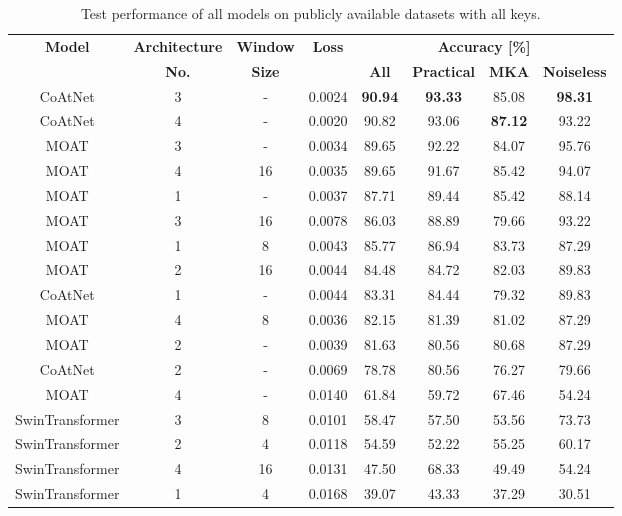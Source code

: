 \documentclass[a4paper,11pt,twoside]{report}
\theoremstyle{definition}
\begin{document}
\begin{table}[h!]
\centering
\caption{Test performance of all models on publicly available datasets with all keys.}
\begin{adjustbox}{max width=\textwidth}
\begin{tabular}{c|c|c|c|cccc}
\hline
\textbf{Model} & \textbf{Architecture} & \textbf{Window} & \textbf{Loss} & \multicolumn{4}{c}{\textbf{Accuracy [\%]}} \\
\cline{5-8}
       &   \textbf{No.}  & \textbf{Size}&        & \textbf{All} & \textbf{Practical} & \textbf{MKA} & \textbf{Noiseless}  \\
\hline
CoAtNet & 3 & - & 0.0024 & \textbf{90.94} & \textbf{93.33} & 85.08 & \textbf{98.31}  \\
CoAtNet & 4 & - & 0.0020 & 90.82 & 93.06 & \textbf{87.12} & 93.22  \\
MOAT & 3 & - & 0.0034 & 89.65 & 92.22 & 84.07 & 95.76  \\
MOAT & 4 & 16 & 0.0035 & 89.65 & 91.67 & 85.42 &	94.07 \\
MOAT & 1 & - & 0.0037 & 87.71 & 89.44 & 85.42 & 88.14  \\
MOAT & 3 & 16 & 0.0078 & 86.03 & 88.89 & 79.66 & 93.22  \\
MOAT & 1 & 8 & 0.0043 & 85.77 & 86.94 & 83.73 & 87.29  \\
MOAT & 2 & 16 & 0.0044 & 84.48 & 84.72 & 82.03 & 89.83  \\
CoAtNet & 1 & - & 0.0044 & 83.31 & 84.44 & 79.32 & 89.83  \\
MOAT & 4 & 8 & 0.0036 & 82.15 & 81.39 & 81.02 & 87.29 \\
MOAT & 2 & - & 0.0039 & 81.63 & 80.56 & 80.68 & 87.29 \\
CoAtNet & 2 & - & 0.0069 & 78.78 & 80.56 & 76.27 & 79.66  \\
MOAT & 4 & - & 0.0140 & 61.84 & 59.72 & 67.46 & 54.24  \\
SwinTransformer & 3 & 8 & 0.0101 & 58.47 & 57.50 & 53.56 & 73.73  \\
SwinTransformer & 2 & 4 & 0.0118 & 54.59 & 52.22 & 55.25 & 60.17  \\
SwinTransformer & 4 & 16 & 0.0131 & 47.50 & 68.33 & 49.49 & 54.24  \\
SwinTransformer & 1 & 4 & 0.0168 & 39.07 & 43.33 & 37.29 & 30.51  \\
\hline
\end{tabular}
\end{adjustbox}
\label{tab:all_keys_clean_results}
\end{table}
\end{document}
